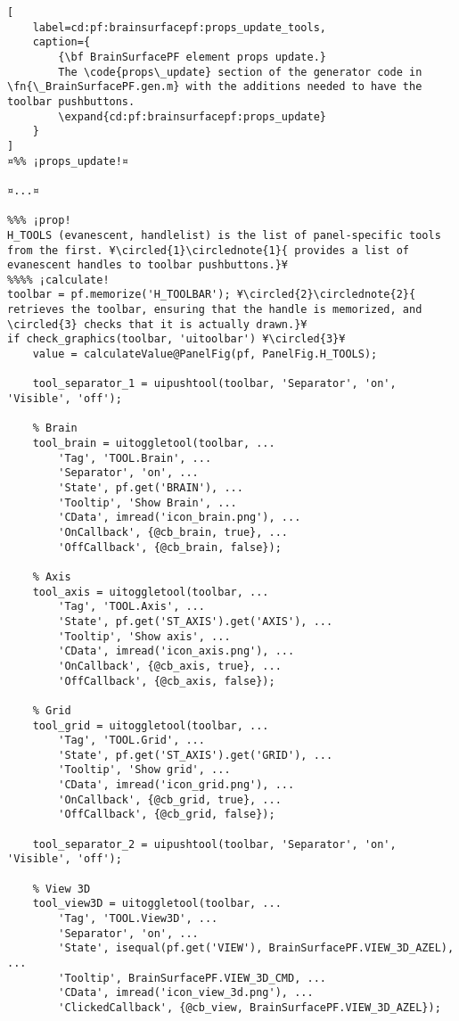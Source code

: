 \documentclass{tufte-handout}
\begin{document}
\begin{lstlisting}[
	label=cd:pf:brainsurfacepf:props_update_tools,
	caption={
		{\bf BrainSurfacePF element props update.}
		The \code{props\_update} section of the generator code in \fn{\_BrainSurfacePF.gen.m} with the additions needed to have the toolbar pushbuttons.
		\expand{cd:pf:brainsurfacepf:props_update}
	}
]
¤%% ¡props_update!¤

¤...¤

%%% ¡prop!
H_TOOLS (evanescent, handlelist) is the list of panel-specific tools from the first. ¥\circled{1}\circlednote{1}{ provides a list of evanescent handles to toolbar pushbuttons.}¥
%%%% ¡calculate!
toolbar = pf.memorize('H_TOOLBAR'); ¥\circled{2}\circlednote{2}{ retrieves the toolbar, ensuring that the handle is memorized, and \circled{3} checks that it is actually drawn.}¥
if check_graphics(toolbar, 'uitoolbar') ¥\circled{3}¥
    value = calculateValue@PanelFig(pf, PanelFig.H_TOOLS);
    
    tool_separator_1 = uipushtool(toolbar, 'Separator', 'on', 'Visible', 'off');

    % Brain
    tool_brain = uitoggletool(toolbar, ...
        'Tag', 'TOOL.Brain', ...
        'Separator', 'on', ...
        'State', pf.get('BRAIN'), ...
        'Tooltip', 'Show Brain', ...
        'CData', imread('icon_brain.png'), ...
        'OnCallback', {@cb_brain, true}, ...
        'OffCallback', {@cb_brain, false});

    % Axis
    tool_axis = uitoggletool(toolbar, ...
        'Tag', 'TOOL.Axis', ...
        'State', pf.get('ST_AXIS').get('AXIS'), ...
        'Tooltip', 'Show axis', ...
        'CData', imread('icon_axis.png'), ...
        'OnCallback', {@cb_axis, true}, ...
        'OffCallback', {@cb_axis, false});

    % Grid
    tool_grid = uitoggletool(toolbar, ...
        'Tag', 'TOOL.Grid', ...
        'State', pf.get('ST_AXIS').get('GRID'), ...
        'Tooltip', 'Show grid', ...
        'CData', imread('icon_grid.png'), ...
        'OnCallback', {@cb_grid, true}, ...
        'OffCallback', {@cb_grid, false});
        
    tool_separator_2 = uipushtool(toolbar, 'Separator', 'on', 'Visible', 'off');

    % View 3D
    tool_view3D = uitoggletool(toolbar, ...
        'Tag', 'TOOL.View3D', ...
        'Separator', 'on', ... 
        'State', isequal(pf.get('VIEW'), BrainSurfacePF.VIEW_3D_AZEL), ...
        'Tooltip', BrainSurfacePF.VIEW_3D_CMD, ...
        'CData', imread('icon_view_3d.png'), ...
        'ClickedCallback', {@cb_view, BrainSurfacePF.VIEW_3D_AZEL});


\end{lstlisting}
\end{document}
